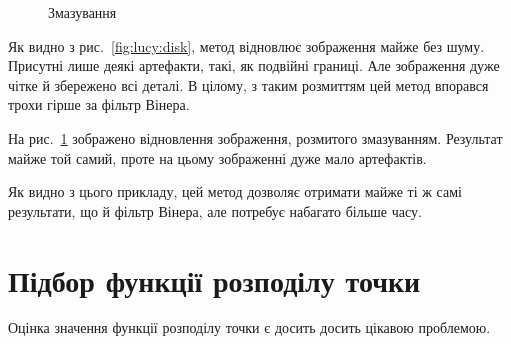 \documentclass{diploma}
\begin{document}
      \begin{figure}[ht]
        \hfill
        \caption{Змазування}
        \label{fig:lucy:motion}
      \end{figure}

      Як видно з рис.~\ref{fig:lucy:disk}, метод відновлює зображення майже
      без шуму.
      Присутні лише деякі артефакти, такі, як подвійні границі.
      Але зображення дуже чітке й збережено всі деталі.
      В цілому, з таким розмиттям цей метод впорався трохи гірше за фільтр
      Вінера.

      На рис.~\ref{fig:lucy:motion} зображено відновлення зображення,
      розмитого змазуванням.
      Результат майже той самий, проте на цьому зображенні дуже мало
      артефактів.

      Як видно з цього прикладу, цей метод дозволяє отримати майже ті ж самі
      результати, що й фільтр Вінера, але потребує набагато більше часу.
      \clearpage
  \section{Підбор функції розподілу точки}
    Оцінка значення функції розподілу точки є досить досить цікавою проблемою.
\end{document}
